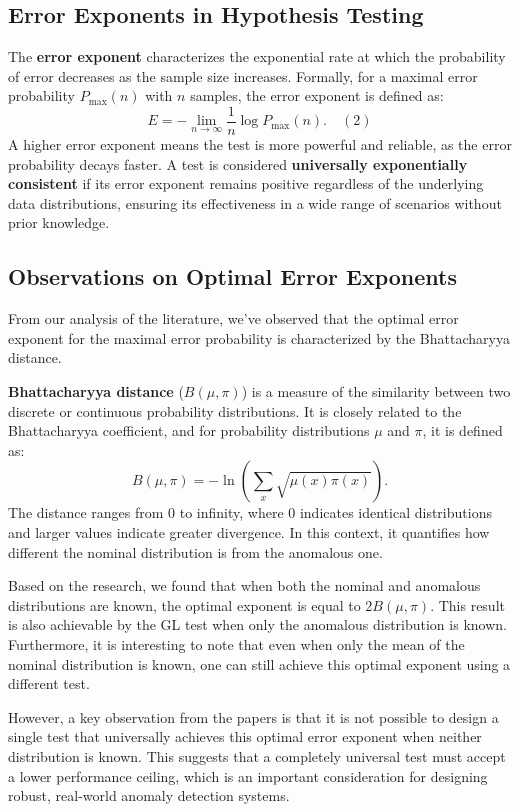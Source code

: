 \subsection{Error Exponents in Hypothesis Testing}
The \textbf{error exponent} characterizes the exponential rate at which the probability of error decreases as the sample size increases. Formally, for a maximal error probability $P_{\max}(n)$ with $n$ samples, the error exponent is defined as:
\[
E = - \lim_{n \to \infty} \frac{1}{n} \log P_{\max}(n). \quad (2)
\]
A higher error exponent means the test is more powerful and reliable, as the error probability decays faster. A test is considered \textbf{universally exponentially consistent} if its error exponent remains positive regardless of the underlying data distributions, ensuring its effectiveness in a wide range of scenarios without prior knowledge.

\subsection{Observations on Optimal Error Exponents}
From our analysis of the literature, we've observed that the optimal error exponent for the maximal error probability is characterized by the Bhattacharyya distance.

\textbf{Bhattacharyya distance} ($B(\mu, \pi)$) is a measure of the similarity between two discrete or continuous probability distributions. It is closely related to the Bhattacharyya coefficient, and for probability distributions $\mu$ and $\pi$, it is defined as:
\[
B(\mu, \pi) = - \ln \left( \sum_{x} \sqrt{\mu(x) \pi(x)} \right).
\]
The distance ranges from 0 to infinity, where 0 indicates identical distributions and larger values indicate greater divergence. In this context, it quantifies how different the nominal distribution is from the anomalous one.

Based on the research, we found that when both the nominal and anomalous distributions are known, the optimal exponent is equal to $2B(\mu, \pi)$. This result is also achievable by the GL test when only the anomalous distribution is known. Furthermore, it is interesting to note that even when only the mean of the nominal distribution is known, one can still achieve this optimal exponent using a different test.

However, a key observation from the papers is that it is not possible to design a single test that universally achieves this optimal error exponent when neither distribution is known. This suggests that a completely universal test must accept a lower performance ceiling, which is an important consideration for designing robust, real-world anomaly detection systems.


